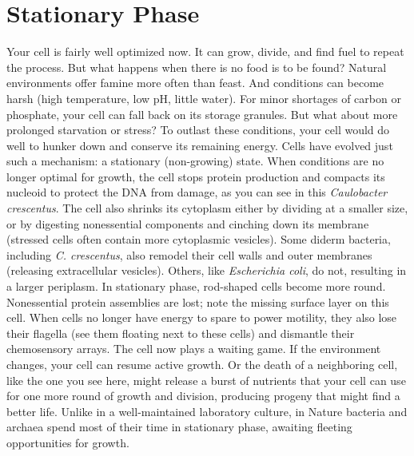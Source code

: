 \documentclass[]{tufte-book}
\begin{document}
\section{Stationary Phase}\label{stationary-phase}

Your cell is fairly well optimized now. It can grow, divide, and find
fuel to repeat the process. But what happens when there is no food is to
be found? Natural environments offer famine more often than feast. And
conditions can become harsh (high temperature, low pH, little water).
For minor shortages of carbon or phosphate, your cell can fall back on
its storage granules. But what about more prolonged starvation or
stress? To outlast these conditions, your cell would do well to hunker
down and conserve its remaining energy. Cells have evolved just such a
mechanism: a stationary (non-growing) state. When conditions are no
longer optimal for growth, the cell stops protein production and
compacts its nucleoid to protect the DNA from damage, as you can see in
this \emph{Caulobacter crescentus}. The cell also shrinks its cytoplasm
either by dividing at a smaller size, or by digesting nonessential
components and cinching down its membrane (stressed cells often contain
more cytoplasmic vesicles). Some diderm bacteria, including \emph{C.
crescentus}, also remodel their cell walls and outer membranes
(releasing extracellular vesicles). Others, like \emph{Escherichia
coli}, do not, resulting in a larger periplasm. In stationary phase,
rod-shaped cells become more round. Nonessential protein assemblies are
lost; note the missing surface layer on this cell. When cells no longer
have energy to spare to power motility, they also lose their flagella
(see them floating next to these cells) and dismantle their chemosensory
arrays. The cell now plays a waiting game. If the environment changes,
your cell can resume active growth. Or the death of a neighboring cell,
like the one you see here, might release a burst of nutrients that your
cell can use for one more round of growth and division, producing
progeny that might find a better life. Unlike in a well-maintained
laboratory culture, in Nature bacteria and archaea spend most of their
time in stationary phase, awaiting fleeting opportunities for growth.
\end{document}
